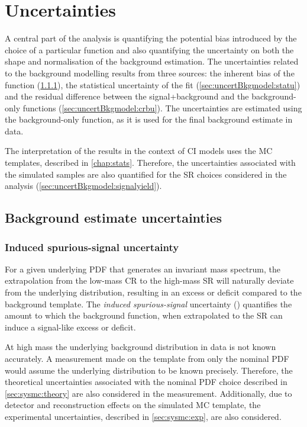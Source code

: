 \chapter{Uncertainties}\label{chap:uncertBkgmodel}
A central part of the analysis is quantifying the potential bias introduced by the choice of a particular function and also quantifying the uncertainty on both the shape and normalisation of the background estimation. The uncertainties related to the background modelling results from three sources: the inherent bias of the function (\cref{sec:uncertBkgmodel:iss}), the statistical uncertainty of the fit (\cref{sec:uncertBkgmodel:statu}) and the residual difference between the signal+background and the background-only functions (\cref{sec:uncertBkgmodel:crbu}). The uncertainties are estimated using the background-only function, as it is used for the final background estimate in data. 

The interpretation of the results in the context of CI models uses the MC templates, described in \cref{chap:stats}. Therefore, the uncertainties associated with the simulated samples are also quantified for the SR choices considered in the analysis (\cref{sec:uncertBkgmodel:signalyield}).
 
\section{Background estimate uncertainties}

\subsection{Induced spurious-signal uncertainty}\label{sec:uncertBkgmodel:iss}
For a given underlying PDF that generates an invariant mass spectrum, the extrapolation from the low-mass CR to the high-mass SR will naturally deviate from the underlying distribution, resulting in an excess or deficit compared to the background template. The \emph{induced spurious-signal} uncertainty (\ISSU) quantifies the amount to which the background function, when extrapolated to the SR can induce a signal-like excess or deficit. 

At high mass the underlying background distribution in data is not known accurately. A \ISSU measurement made on the template from only the nominal PDF would assume the underlying distribution to be known precisely. Therefore, the theoretical uncertainties associated with the nominal PDF choice described in \cref{sec:sysmc:theory} are also considered in the \ISSU measurement. Additionally, due to detector and reconstruction effects on the simulated MC template, the experimental uncertainties, described in \cref{sec:sysmc:exp}, are also considered. 

